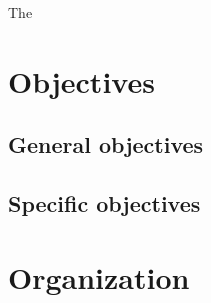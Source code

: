 The \cite{mceliece1978public}
\section{Objectives}
\subsection{General objectives}
\subsection{Specific objectives}
\section{Organization}
